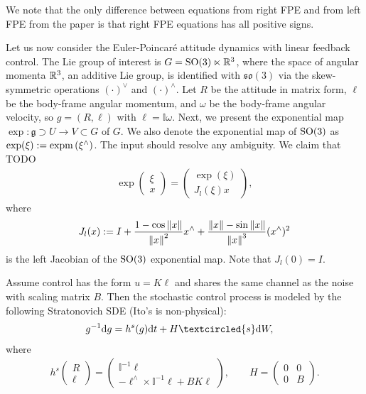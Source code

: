\documentclass[12pt,class=article,crop=false]{standalone}
\begin{document}
We note that the only difference between equations from right FPE and from left FPE from the paper is that right FPE equations has all positive signs.


Let us now consider the Euler-Poincar\'{e} attitude dynamics with linear feedback control. The Lie group of interest is $ G = \operatorname{SO}(3) \ltimes \mathbb{R}^{3}$, where the space of angular momenta $ \mathbb{R}^{3}$, an additive Lie group, is identified with $ \mathfrak{so}(3)$ via the skew-symmetric operations $ ( \cdot )^\vee$ and $ ( \cdot )^\wedge $. Let $ R$ be the attitude in matrix form, $ \ell$ be the body-frame angular momentum, and  $ \omega$ be the body-frame angular velocity, so $ g = (R, \ell)$ with $ \ell = \mathbb{I} \omega$. Next, we present the exponential map $ \exp:  \mathfrak{g} \supset U \to V \subset G$ of $ G$. We also denote the exponential map of $ \operatorname{SO}(3)$ as $ \exp ( \xi) := \operatorname{expm} \left( \xi^\wedge \right) $. The input should resolve any ambiguity. We claim that TODO
\begin{align*}
	\exp \begin{pmatrix} \xi \\ x \end{pmatrix} = \begin{pmatrix} \exp( \xi )\\ J_l( \xi) x \end{pmatrix} ,
\end{align*}
where
\begin{align*}
	J_l(x) := I + \frac{1- \cos {\left\lVert{ x}\right\rVert} }{ {\left\lVert{ x}\right\rVert}^2 } x^\wedge + \frac{{\left\lVert{ x}\right\rVert} - \sin {\left\lVert{ x}\right\rVert}  }{ {\left\lVert{ x}\right\rVert}^3 } ( x^\wedge )^2 
\end{align*}
is the left Jacobian of the $ \operatorname{SO}(3)$ exponential map. Note that $ J_l(0) = I$.

Assume control has the form $ u = K \ell$ and shares the same channel as the noise with scaling matrix $ B$. Then the stochastic control process is modeled by the following Stratonovich SDE (Ito's is non-physical):
\begin{align*}
	g^{-1}\d g &= h^s(g)\d t+ H \textcircled{s}  \d W,  
\end{align*}
where
\begin{align*}
	h^s \begin{pmatrix} R\\ \ell \end{pmatrix} = \begin{pmatrix} \mathbb{I} ^{-1} \ell \\ - \ell^\wedge  \times \mathbb{I}^{-1} \ell + BK \ell \end{pmatrix}  , \qquad H = \begin{pmatrix} 0 &0\\0& B \end{pmatrix} .
\end{align*}
\end{document}
